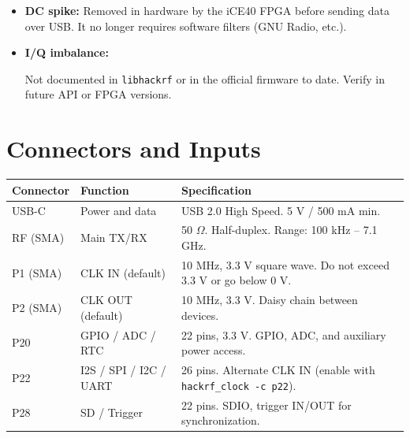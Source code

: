 \documentclass[11pt]{article}
\begin{document}
\begin{itemize}
    \item \textbf{DC spike:} Removed in hardware by the iCE40 FPGA before sending data over USB. It no longer requires software filters (GNU Radio, etc.).
    \item \textbf{I/Q imbalance:}
    \begin{pendingbox}
    Not documented in \texttt{libhackrf} or in the official firmware to date. Verify in future API or FPGA versions.
    \end{pendingbox}
\end{itemize}

\section{Connectors and Inputs}

\begin{table}[h]
    \centering
    \small
    \begin{tabular}{p{}p{}p{}}
        \toprule
        \textbf{Connector} & \textbf{Function} & \textbf{Specification} \\
        \midrule
        USB-C      & Power and data & USB 2.0 High Speed. 5 V / 500 mA min. \\
        RF (SMA)   & Main TX/RX & 50 $\Omega$. Half-duplex. Range: 100 kHz -- 7.1 GHz. \\
        P1 (SMA)   & CLK IN (default) & 10 MHz, 3.3 V square wave. Do not exceed 3.3 V or go below 0 V. \\
        P2 (SMA)   & CLK OUT (default) & 10 MHz, 3.3 V. Daisy chain between devices. \\
        P20        & GPIO / ADC / RTC & 22 pins, 3.3 V. GPIO, ADC, and auxiliary power access. \\
        P22        & I2S / SPI / I2C / UART & 26 pins. Alternate CLK IN (enable with \texttt{hackrf\_clock -c p22}). \\
        P28        & SD / Trigger & 22 pins. SDIO, trigger IN/OUT for synchronization. \\
        \bottomrule
    \end{tabular}
\end{table}
\end{document}

